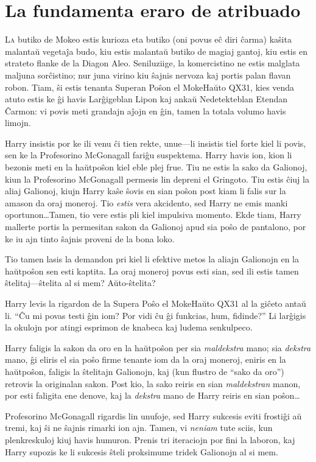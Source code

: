 \chapter{La fundamenta eraro de atribuado}

\lettrine{L}a butiko de Mokeo estis kurioza eta butiko (oni povus eĉ
diri ĉarma) kaŝita malantaŭ vegetaĵa budo, kiu estis malantaŭ butiko
de magiaj gantoj, kiu estis en strateto flanke de la Diagon
Aleo. Seniluziige, la komercistino ne estis malglata maljuna
sorĉistino; nur juna virino kiu ŝajnis nervoza kaj portis palan flavan
robon. Tiam, ŝi estis tenanta Superan Poŝon el MokeHaŭto QX31, kies
venda atuto estis ke ĝi havis Larĝigeblan Lipon kaj ankaŭ
Nedetekteblan Etendan Ĉarmon: vi povis meti grandajn aĵojn en ĝin,
tamen la totala volumo havis limojn.

Harry insistis por ke ili venu ĉi tien rekte, unue—li insistis tiel
forte kiel li povis, sen ke la Profesorino McGonagall fariĝu
suspektema. Harry havis ion, kion li bezonis meti en la haŭtpoŝon kiel
eble plej frue. Tiu ne estis la sako da Galionoj, kiun la Profesorino
McGonagall permesis lin depreni el Gringoto. Tiu estis ĉiuj la aliaj
Galionoj, kiujn Harry kaŝe ŝovis en sian poŝon post kiam li falis sur
la amason da oraj moneroj. Tio \emph{estis} vera akcidento, sed Harry
ne emis manki oportunon\ldots Tamen, tio vere estis pli kiel impulsiva
momento. Ekde tiam, Harry mallerte portis la permesitan sakon da
Galionoj apud sia poŝo de pantalono, por ke iu ajn tinto ŝajnis
proveni de la bona loko.

Tio tamen lasis la demandon pri kiel li efektive metos la aliajn
Galionojn en la haŭtpoŝon sen esti kaptita. La oraj moneroj povus
esti sian, sed ili estis tamen ŝtelitaj—ŝtelita al si mem?
Aŭto-ŝtelita?

Harry levis la rigardon de la Supera Poŝo el MokeHaŭto QX31 al la
giĉeto antaŭ li.  ``Ĉu mi povas testi ĝin iom? Por vidi ĉu ĝi
funkcias, hum, fidinde?'' Li larĝigis la okulojn por atingi esprimon
de knabeca kaj ludema senkulpeco.

Harry faligis la sakon da oro en la haŭtpoŝon per sia
\emph{maldekstra} mano; sia \emph{dekstra} mano, ĝi eliris el sia poŝo
firme tenante iom da la oraj moneroj, eniris en la haŭtpoŝon, faligis
la ŝtelitajn Galionojn, kaj (kun flustro de ``sako da oro'') retrovis
la originalan sakon. Post kio, la sako reiris en sian
\emph{maldekstran} manon, por esti faligita ene denove, kaj la
\emph{dekstra} mano de Harry reiris en sian poŝon\ldots

Profesorino McGonagall rigardis lin unufoje, sed Harry sukcesis eviti
frostiĝi aŭ tremi, kaj ŝi ne ŝajnis rimarki ion ajn. Tamen, vi
\emph{neniam} tute sciis, kun plenkreskuloj kiuj havis humuron. Prenis
tri iteraciojn por fini la laboron, kaj Harry supozis ke li sukcesis
ŝteli proksimume tridek Galionojn al si mem.

